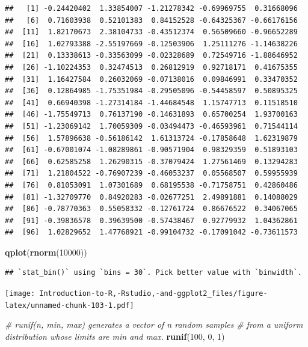\documentclass[]{book}
\newenvironment{Shaded}{\begin{snugshade}}{\end{snugshade}}
\newcommand{\CommentTok}[1]{\textcolor[rgb]{0.56,0.35,0.01}{\textit{#1}}}
\newcommand{\DecValTok}[1]{\textcolor[rgb]{0.00,0.00,0.81}{#1}}
\newcommand{\KeywordTok}[1]{\textcolor[rgb]{0.13,0.29,0.53}{\textbf{#1}}}
\newcommand{\NormalTok}[1]{#1}
\begin{document}
\begin{verbatim}
##   [1] -0.24420402  1.33854007 -1.21278342 -0.69969755  0.31668096
##   [6]  0.71603938  0.52101383  0.84152528 -0.64325367 -0.66176156
##  [11]  1.82170673  2.38104733 -0.43512374  0.56509660 -0.96652289
##  [16]  1.02793388 -2.55197669 -0.12503906  1.25111276 -1.14638226
##  [21]  0.13338613 -0.33563099 -0.02328689  0.72549716 -1.88646952
##  [26] -1.10224353  0.32474513  0.26812919  0.92718171  0.41675355
##  [31]  1.16427584  0.26032069 -0.07138016  0.09846991  0.33470352
##  [36]  0.12864985 -1.75351984 -0.29505096 -0.54458597  0.50895325
##  [41]  0.66940398 -1.27314184 -1.44684548  1.15747713  0.11518510
##  [46] -1.75549713  0.76137190 -0.14631893  0.65700254  1.93700163
##  [51] -1.23069142  1.70059309 -0.03494473 -0.46593961  0.71544114
##  [56]  1.57896638 -0.56186142  1.61313724 -0.17858648  1.62319879
##  [61] -0.67001074 -1.08289861 -0.90571904  0.98329359  0.51893103
##  [66]  0.62585258  1.26290315 -0.37079424  1.27561469  0.13294283
##  [71]  1.21804522 -0.76907239 -0.46053237  0.05568507  0.59955939
##  [76]  0.81053091  1.07301689  0.68195538 -0.71758751  0.42860486
##  [81] -1.32709770  0.84920283 -0.02677251  2.49891881  0.14088029
##  [86] -0.78770363  0.55058332 -0.12761724  0.86676522  0.34067065
##  [91] -0.39836578  0.39639500 -0.57438467  0.92779932  1.04362861
##  [96]  1.02829652  1.47768921 -0.99104732 -0.17091042 -0.73611573
\end{verbatim}

\begin{Shaded}
\begin{Highlighting}[]
\KeywordTok{qplot}\NormalTok{(}\KeywordTok{rnorm}\NormalTok{(}\DecValTok{10000}\NormalTok{))}
\end{Highlighting}
\end{Shaded}

\begin{verbatim}
## `stat_bin()` using `bins = 30`. Pick better value with `binwidth`.
\end{verbatim}

\texttt{[image: Introduction-to-R,-Rstudio,-and-ggplot2\_files/figure-latex/unnamed-chunk-103-1.pdf]}

\begin{Shaded}
\begin{Highlighting}[]
\CommentTok{# runif(n, min, max) generates a vector of n random samples }
\CommentTok{# from a uniform distribution whose limits are min and max. }
\KeywordTok{runif}\NormalTok{(}\DecValTok{100}\NormalTok{, }\DecValTok{0}\NormalTok{, }\DecValTok{1}\NormalTok{)}
\end{Highlighting}
\end{Shaded}
\end{document}
